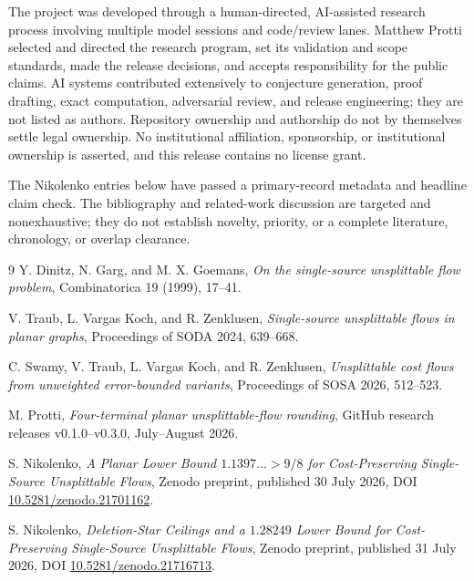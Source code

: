 \documentclass[11pt]{article}
\theoremstyle{remark}
\begin{document}
The project was developed through a human-directed, AI-assisted research
process involving multiple model sessions and code/review lanes. Matthew
Protti selected and directed the research program, set its validation and scope
standards, made the release decisions, and accepts responsibility for the
public claims. AI systems contributed extensively to conjecture generation,
proof drafting, exact computation, adversarial review, and release engineering;
they are not listed as authors. Repository ownership and authorship do not by
themselves settle legal ownership. No institutional affiliation, sponsorship,
or institutional ownership is asserted, and this release contains no license
grant.

The Nikolenko entries below have passed a primary-record metadata and headline
claim check. The bibliography and related-work discussion are targeted and
nonexhaustive; they do not establish novelty, priority, or a complete
literature, chronology, or overlap clearance.

\begin{thebibliography}{9}
Y. Dinitz, N. Garg, and M. X. Goemans,
\emph{On the single-source unsplittable flow problem},
Combinatorica 19 (1999), 17--41.

V. Traub, L. Vargas Koch, and R. Zenklusen,
\emph{Single-source unsplittable flows in planar graphs},
Proceedings of SODA 2024, 639--668.

C. Swamy, V. Traub, L. Vargas Koch, and R. Zenklusen,
\emph{Unsplittable cost flows from unweighted error-bounded variants},
Proceedings of SOSA 2026, 512--523.

M. Protti,
\emph{Four-terminal planar unsplittable-flow rounding},
GitHub research releases v0.1.0--v0.3.0, July--August 2026.

S. Nikolenko,
\emph{A Planar Lower Bound $1.1397\ldots>9/8$ for Cost-Preserving
Single-Source Unsplittable Flows},
Zenodo preprint, published 30 July 2026,
DOI \href{https://doi.org/10.5281/zenodo.21701162}%
{10.5281/zenodo.21701162}.

S. Nikolenko,
\emph{Deletion-Star Ceilings and a $1.28249$ Lower Bound for
Cost-Preserving Single-Source Unsplittable Flows},
Zenodo preprint, published 31 July 2026,
DOI \href{https://doi.org/10.5281/zenodo.21716713}%
{10.5281/zenodo.21716713}.
\end{thebibliography}
\end{document}
